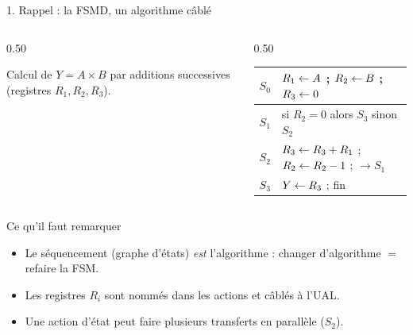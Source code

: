 
\begin{frame}{1. Rappel : la FSMD, un algorithme câblé}
\begin{columns}[T]
\begin{column}{0.50\textwidth}
\centering
{}

\vspace{2mm}
\footnotesize Calcul de $Y = A \times B$ par additions successives (registres $R_1,R_2,R_3$).
\end{column}
\begin{column}{0.50\textwidth}
\scriptsize
\renewcommand{\arraystretch}{1.3}
\begin{tabular}{|c|l|}
\hline
\rowcolor{\cS} $S_0$ & $R_1 \leftarrow A$ ;\; $R_2 \leftarrow B$ ;\; $R_3 \leftarrow 0$ \\ \hline
\rowcolor{\cT} $S_1$ & si $R_2 = 0$ alors $S_3$ sinon $S_2$ \\ \hline
\rowcolor{\cU} $S_2$ & $R_3 \leftarrow R_3 + R_1$ ;\; $R_2 \leftarrow R_2 - 1$ ;\; $\to S_1$ \\ \hline
\rowcolor{\cV} $S_3$ & $Y \leftarrow R_3$ ;\; fin \\ \hline
\end{tabular}
\end{column}
\end{columns}

\vspace{3mm}
\begin{block}{Ce qu'il faut remarquer}
\footnotesize
\begin{itemize}\setlength{\itemsep}{1pt}
 \item Le \alert{séquencement} (graphe d'états) \emph{est} l'algorithme : changer d'algorithme $=$ refaire la FSM.
 \item Les registres $R_i$ sont \alert{nommés} dans les actions et \alert{câblés} à l'UAL.
 \item Une action d'état peut faire \alert{plusieurs transferts en parallèle} ($S_2$).
\end{itemize}
\end{block}
\end{frame}


